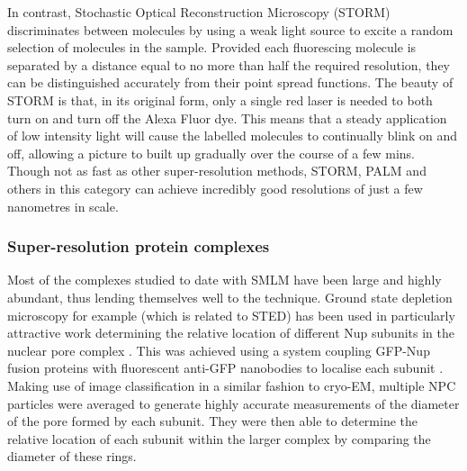 \documentclass[a4paper,11pt,twoside,openright]{scrbook}
\begin{document}
In contrast, Stochastic Optical Reconstruction Microscopy \cite{Rust2006} (STORM) discriminates between molecules by using a weak light source to excite a random selection of molecules in the sample. Provided each fluorescing molecule is separated by a distance equal to no more than half the required resolution, they can be distinguished accurately from their point spread functions. The beauty of STORM is that, in its original form, only a single red laser is needed to both turn on and turn off the Alexa Fluor dye. This means that a steady application of low intensity light will cause the labelled molecules to continually blink on and off, allowing a picture to built up gradually over the course of a few mins. Though not as fast as other super-resolution methods, STORM, PALM and others in this category can achieve incredibly good resolutions of just a few nanometres in scale.

\subsubsection{Super-resolution protein complexes}
Most of the complexes studied to date with SMLM have been large and highly abundant, thus lending themselves well to the technique. Ground state depletion microscopy for example (which is related to STED) has been used in particularly attractive work determining the relative location of different Nup subunits in the nuclear pore complex \cite{Szymborska2013}. This was achieved using a system coupling GFP-Nup fusion proteins with fluorescent anti-GFP nanobodies to localise each subunit \cite{Ries2012}. Making use of image classification in a similar fashion to cryo-EM, multiple NPC particles were averaged to generate highly accurate measurements of the diameter of the pore formed by each subunit. They were then able to determine the relative location of each subunit within the larger complex by comparing the diameter of these rings.
\end{document}

